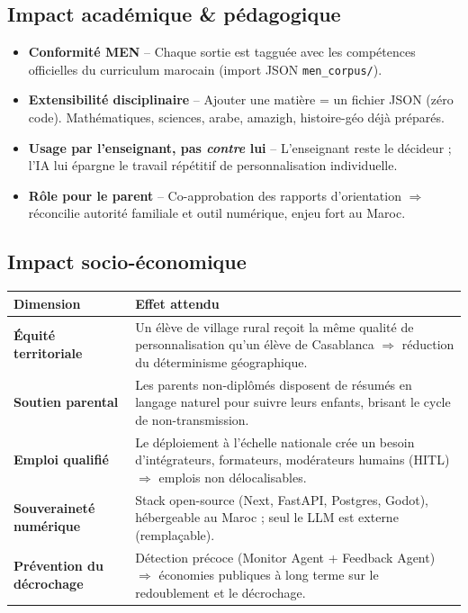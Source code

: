 \documentclass[11pt,a4paper]{article}
\begin{document}
\subsection{Impact académique \& pédagogique}

\begin{itemize}
\item \textbf{Conformité MEN} -- Chaque sortie est tagguée avec les compétences
officielles du curriculum marocain (import JSON \texttt{men\_corpus/}).
\item \textbf{Extensibilité disciplinaire} -- Ajouter une matière = un fichier JSON
(zéro code). Mathématiques, sciences, arabe, amazigh, histoire-géo déjà préparés.
\item \textbf{Usage par l'enseignant, pas \textit{contre} lui} -- L'enseignant
reste le décideur ; l'IA lui épargne le travail répétitif de personnalisation
individuelle.
\item \textbf{Rôle pour le parent} -- Co-approbation des rapports d'orientation
$\Rightarrow$ réconcilie autorité familiale et outil numérique, enjeu fort au Maroc.
\end{itemize}

\subsection{Impact socio-économique}

\begin{center}
\small
\begin{tabular}{@{}p{4.3cm}p{10.5cm}@{}}
\toprule
\textbf{Dimension} & \textbf{Effet attendu} \\
\midrule
\textbf{Équité territoriale}    & Un élève de village rural reçoit la même qualité de personnalisation qu'un élève de Casablanca $\Rightarrow$ réduction du déterminisme géographique.\\
\textbf{Soutien parental}       & Les parents non-diplômés disposent de résumés en langage naturel pour suivre leurs enfants, brisant le cycle de non-transmission.\\
\textbf{Emploi qualifié}        & Le déploiement à l'échelle nationale crée un besoin d'intégrateurs, formateurs, modérateurs humains (HITL) $\Rightarrow$ emplois non délocalisables.\\
\textbf{Souveraineté numérique} & Stack open-source (Next, FastAPI, Postgres, Godot), hébergeable au Maroc ; seul le LLM est externe (remplaçable).\\
\textbf{Prévention du décrochage} & Détection précoce (Monitor Agent + Feedback Agent) $\Rightarrow$ économies publiques à long terme sur le redoublement et le décrochage.\\
\bottomrule
\end{tabular}
\end{center}
\end{document}
